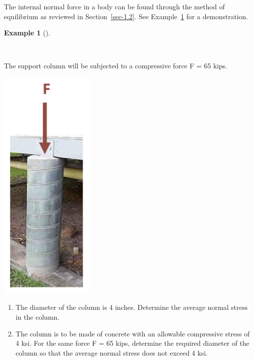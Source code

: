 \documentclass[
  letterpaper,
  DIV=11,
  numbers=noendperiod]{scrreprt}
\theoremstyle{definition}
\newtheorem{example}{Example}[chapter]
\theoremstyle{remark}
\begin{document}
The internal normal force in a body can be found through the method of
equilibrium as reviewed in Section~\ref{sec-1.2}. See
Example~\ref{exm-2.1} for a demonstration.

\begin{tcolorbox}[enhanced jigsaw, colback=white, colframe=quarto-callout-tip-color-frame, toptitle=1mm, arc=.35mm, bottomrule=.15mm, toprule=.15mm, opacitybacktitle=0.6, title={Example 2.1}, coltitle=black, breakable, colbacktitle=quarto-callout-tip-color!10!white, bottomtitle=1mm, titlerule=0mm, opacityback=0, leftrule=.75mm, left=2mm, rightrule=.15mm]

\begin{example}[]\protect\hypertarget{exm-2.1}{}\label{exm-2.1}

~

The support column will be subjected to a compressive force F = 65 kips.

\begin{center}
\includegraphics[width=1.8125in,height=\textheight]{images/Updated CH2 examples/example 2.1 part 1.png}
\end{center}

\begin{enumerate}
\def\labelenumi{\arabic{enumi}.}
\item
  The diameter of the column is 4 inches. Determine the average normal
  stress in the column.
\item
  The column is to be made of concrete with an allowable compressive
  stress of 4 ksi. For the same force F = 65 kips, determine the
  required diameter of the column so that the average normal stress does
  not exceed 4 ksi.
\end{enumerate}


\end{example}
\end{tcolorbox}
\end{document}
